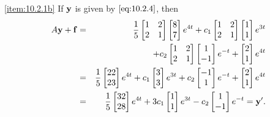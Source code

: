 \documentclass{ximera}
\begin{document}
\begin{example}
\begin{explanation}
\ref{item:10.2.1b}
If ${\bf y}$ is given by $\eqref{eq:10.2.4}$, then
\begin{eqnarray*}
A{\bf y}+{\bf f}&=&
\frac{1}{5}\begin{bmatrix}1&2\\2&1\end{bmatrix}\begin{bmatrix}8\\7\end{bmatrix}e^{4t}+
c_1\begin{bmatrix}1&2\\2&1\end{bmatrix}\begin{bmatrix}1\\1\end{bmatrix}e^{3t}\\
&&+c_2\begin{bmatrix}1&2\\2&1\end{bmatrix}\begin{bmatrix}1\\-1\end{bmatrix}e^{-t}
+\begin{bmatrix}2\\1\end{bmatrix}e^{4t}\\
&=&\frac{1}{5}\begin{bmatrix}22\\23\end{bmatrix}e^{4t}+c_1\begin{bmatrix}3\\3\end{bmatrix}e^{3t}+c_2\begin{bmatrix}-1\\1\end{bmatrix}e^{-t}
+\begin{bmatrix}2\\1\end{bmatrix}e^{4t}\\
&=&\frac{1}{5}\begin{bmatrix}32\\28\end{bmatrix}e^{4t}+3c_1\begin{bmatrix}1\\1\end{bmatrix}e^{3t}-c_2\begin{bmatrix}1\\-1\end{bmatrix}e^{-t}
={\bf y}'.
\end{eqnarray*}


\end{explanation}
\end{example}
\end{document}
